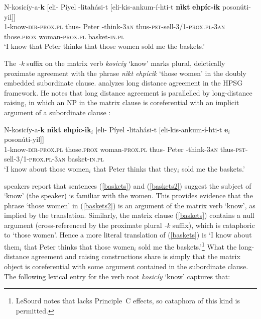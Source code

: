\documentclass[output=paper
 	        ,biblatex
                ,babelshorthands
                ,newtxmath
                ,draftmode
                ,colorlinks, citecolor=brown
]{langscibook}
\begin{document}
\begin{exe}
\ex\label{baskets}
\gll N-kosic\'{i}y-a-\textbf{k}  [eli- P\'{i}yel -litah\'{a}si-t           {[eli-kis-ankum-\'{i}-hti-t}   \textbf{n\`{i}kt}  \textbf{ehp\'{i}c-ik}	{poson\'{u}ti-yil]]} \\
     1-know-\textsc{dir-prox.pl} \spacebr{}thus- Peter -think-\textsc{3an} { \spacebr{}thus-\textsc{pst}-sell-\textsc{3/1-prox.pl-3an}}         those.\textsc{prox}  woman-\textsc{prox.pl}     basket-\textsc{in.pl}\\
\glt `I know that Peter thinks that those women sold me the baskets.’
\end{exe}

\noindent
The \textit{-k} suffix on the matrix verb \textit{kosic\'{i}y} `know' marks plural, deictically proximate agreement with the phrase \textit{n\`{i}kt ehp\'{i}cik} `those women'  in the doubly embedded subordinate clause.  \citet{LeSourd:2018} analyzes  long distance agreement in the HPSG framework.   He notes that   long distance agreement is parallelled by long-distance raising, in which an NP in the matrix clause is coreferential with an implicit argument of a subordinate clause \citep[example\,(4)]{LeSourd:2018}:  

\begin{exe}
\ex\label{baskets2}
\gll N-kosic\'{i}y-a-\textbf{k} \textbf{n\`{i}kt}  \textbf{ehp\'{i}c-ik}$_i$ [eli- P\'{i}yel -litah\'{a}si-t  [eli-kis-ankum-\'{i}-hti-t  \textbf{e$_i$} 	{poson\'{u}ti-yil]]} \\
     1-know-\textsc{dir-prox.pl} those.\textsc{prox}  woman-\textsc{prox.pl} \spacebr{}thus- Peter -think-\textsc{3an} \spacebr{}thus-\textsc{pst}-sell-\textsc{3/1-prox.pl-3an}         {}    basket-\textsc{in.pl}\\
\glt `I know about those women$_i$ that Peter thinks that they$_i$ sold me the baskets.’
\end{exe}

\noindent
{} speakers report that sentences (\ref{baskets}) and (\ref{baskets2}) suggest the subject of `know' (the speaker) is familiar with the women.  This provides evidence that the phrase `those women' in (\ref{baskets2}) is an argument of the matrix verb `know', as implied by the translation.  
Similarly, the matrix clause (\ref{baskets}) contains a null argument (cross-referenced by the proximate plural \textit{-k}  suffix), which is  cataphoric to `those women'.  Hence a more literal translation of (\ref{baskets}) is `I know about them$_i$ that Peter thinks that those women$_i$ sold me the baskets.'\footnote{LeSourd notes that  lacks Principle~C effects, so cataphora of this kind is permitted.}  What the long-distance agreement and raising constructions share is simply that the matrix object is coreferential with some argument contained in the subordinate clause.  The following lexical entry for the verb root \textit{kosic\'{i}y} `know' captures that:
\end{document}
